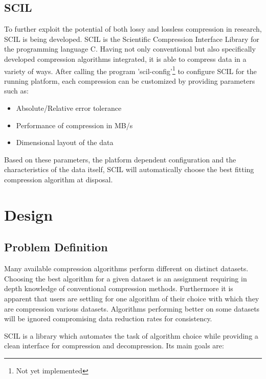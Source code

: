 \documentclass[
	12pt,
	a4paper,
	BCOR10mm,
	DIV14,
	headsepline,
]{scrreprt}
\begin{document}
\clearpage

\section{SCIL}

To further exploit the potential of both lossy and lossless compression in
research, SCIL is being developed. SCIL is the Scientific Compression Interface
Library for the programming language C. Having not only conventional but also
specifically developed compression algorithms integrated, it is able to compress
data in a variety of ways. After calling the program
'scil-config'\footnote{Not yet implemented} to configure SCIL for the running
platform, each compression can be customized by providing parameters such as:

\bigskip

\begin{itemize}
	\item Absolute/Relative error tolerance
	\item Performance of compression in MB/s
	\item Dimensional layout of the data
\end{itemize}

\bigskip

Based on these parameters, the platform dependent configuration and the
characteristics of the data itself, SCIL will automatically choose the best
fitting compression algorithm at disposal\footnotemark[\value{footnote}].\par

\setcounter{footnote}{0}

\chapter{Design}
\label{Design}

\section{Problem Definition}

\bigskip

Many available compression algorithms perform different on distinct datasets.
Choosing the best algorithm for a given dataset is an assignment requiring
in depth knowledge of conventional compression methods. Furthermore it is
apparent that users are settling for one algorithm of their choice with which
they are compression various datasets. Algorithms performing better on some
datasets will be ignored compromising data reduction rates for consistency.\par
SCIL is a library which automates the task of algorithm choice while providing
a clean interface for compression and decompression. Its main goals are:
\end{document}

